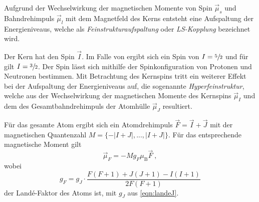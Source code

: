     Aufgrund der Wechselwirkung der magnetischen Momente von Spin $\vec{\mu}_s$ und Bahndrehimpuls $\vec{\mu}_l$ mit dem Magnetfeld des Kerns entsteht eine Aufspaltung der Energieniveaus,
    welche als \textit{Feinstrukturaufspaltung} oder \textit{LS-Kopplung} bezeichnet wird.

    Der Kern hat den Spin $\vec{I}$.
    Im Falle von  ergibt sich ein Spin von $I = \sfrac{5}{2}$ und für  gilt $I = \sfrac{3}{2}$.
    Der Spin lässt sich mithilfe der Spinkonfiguration von Protonen und Neutronen bestimmen.
    Mit Betrachtung des Kernspins tritt ein weiterer Effekt bei der Aufspaltung der Energieniveaus auf,
    die sogenannte \textit{Hyperfeinstruktur},
    welche aus der Wechselwirkung der magnetischen Momente des Kernspins $\vec{\mu}_I$ und dem des Gesamtbahndrehimpuls der Atomhülle $\vec{\mu}_J$ resultiert.

    Für das gesamte Atom ergibt sich ein Atomdrehimpuls $\vec{F} = \vec{I} + \vec{J}$ mit der magnetischen Quantenzahl $M = \{-\lvert I+J \rvert, ..., \lvert I+J \rvert\}$.
    Für das entsprechende magnetische Moment gilt
    \begin{equation}
        \vec{\mu}_F = - M g_F \mu_\text{B} \vec{F} \ ,
    \end{equation}
    wobei
    \begin{equation}
        g_F = g_J \cdot \frac{F(F+1) + J(J+1) - I(I+1)}{2F(F+1)}
        \label{eqn:landeF}
    \end{equation}
    der Landé-Faktor des Atoms ist,
    mit $g_J$ aus \autoref{eqn:landeJ}.

